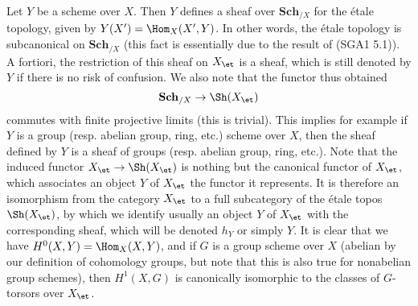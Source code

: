 \begin{example}\label{scheme etale site subcanonical}
Let $Y$ be a scheme over $X$. Then $Y$ defines a sheaf over $\mathbf{Sch}_{/X}$ for the \'etale topology, given by $Y(X')=\Hom_X(X',Y)$. In other words, the \'etale topology is subcanonical on $\mathbf{Sch}_{/X}$ (this fact is essentially due to the result of (SGA1  5.1)). A fortiori, the restriction of this sheaf on $X_\et$ is a sheaf, which is still denoted by $Y$ if there is no risk of confusion. We also note that the functor thus obtained
\[\mathbf{Sch}_{/X}\to\Sh(X_\et)\]
commutes with finite projective limits (this is trivial). This implies for example if $Y$ is a group (resp. abelian group, ring, etc.) scheme over $X$, then the sheaf defined by $Y$ is a sheaf of groups (resp. abelian group, ring, etc.). Note that the induced functor $X_\et\to\Sh(X_\et)$ is nothing but the canonical functor of $X_\et$, which associates an object $Y$ of $X_\et$ the functor it represents. It is therefore an isomorphism from the category $X_\et$ to a full subcategory of the \'etale topos $\Sh(X_\et)$, by which we identify usually an object $Y$ of $X_\et$ with the corresponding sheaf, which will be denoted $h_Y$ or simply $Y$. It is clear that we have $H^0(X,Y)=\Hom_X(X,Y)$, and if $G$ is a group scheme over $X$ (abelian by our definition of cohomology groups, but note that this is also true for nonabelian group schemes), then $H^1(X,G)$ is canonically isomorphic to the classes of $G$-torsors over $X_\et$.
\end{example}

